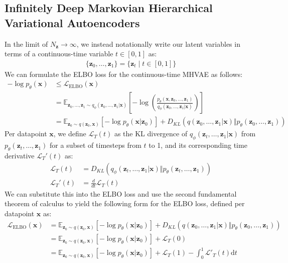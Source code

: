 \documentclass[ oneside,%
                    author={George Herbert},
                    degree={MSci},
                     title={Video Diffusion Models for Climate Simulations},
                  subtitle={}]{dissertation}
\begin{document}
\subsection{Infinitely Deep Markovian Hierarchical Variational Autoencoders}
\label{sec:background_vae_infinite}

In the limit of $N_\mathbf{z}\to\infty$, we instead notationally write our latent variables in terms of a continuous-time variable $t\in[0,1]$ as:
\begin{align}
      \{\mathbf{z}_0,\ldots,\mathbf{z}_1\}=\{\mathbf{z}_t\mid t\in[0,1]\}
\end{align}
We can formulate the ELBO loss for the continuous-time MHVAE as follows:
\begin{align}
      -\log p_\theta(\mathbf{x})&\le \mathcal{L}_{\mathrm{ELBO}}(\mathbf{x})\\
      &=\mathbb{E}_{\mathbf{z}_0,\ldots,\mathbf{z}_1\sim q_\phi(\mathbf{z}_0,\ldots,\mathbf{z}_1|\mathbf{x})}\left[-\log\left(\frac{p_\theta(\mathbf{x},\mathbf{z}_0,\ldots,\mathbf{z}_1)}{q_\phi(\mathbf{z}_0,\ldots,\mathbf{z}_1|\mathbf{x})}\right) \right]\\
      &=\mathbb{E}_{\mathbf{z}_0\sim q(\mathbf{z}_0,\mathbf{x})}\left[-\log p_\theta(\mathbf{x}|\mathbf{z}_0)\right]+D_{KL}(q(\mathbf{z}_0,\ldots,\mathbf{z}_1|\mathbf{x})\Vert p_\theta (\mathbf{z}_0,\ldots,\mathbf{z}_1))
\end{align}
Per datapoint $\mathbf{x}$, we define $\mathcal{L}_T(t)$ as the KL divergence of $q_\phi(\mathbf{z}_t,\ldots,\mathbf{z}_1|\mathbf{x})$ from $p_\theta(\mathbf{z}_t,\ldots,\mathbf{z}_1)$ for a subset of timesteps from $t$ to 1, and its corresponding time derivative $\mathcal{L}_T'(t)$ as:
\begin{align}
      \mathcal{L}_T(t)&=D_{KL}(q_\phi(\mathbf{z}_t,\ldots,\mathbf{z}_1|\mathbf{x})\Vert p_\theta(\mathbf{z}_t,\ldots,\mathbf{z}_1))\label{eq:dkl_t}\\
      \mathcal{L}_T'(t)&=\frac{d}{dt}\mathcal{L}_T(t)
\end{align}
We can substitute this into the ELBO loss and use the second fundamental theorem of calculus to yield the following form for the ELBO loss, defined per datapoint $\mathbf{x}$ as:
\begin{align}
      \mathcal{L}_{\mathrm{ELBO}}(\mathbf{x})&=\mathbb{E}_{\mathbf{z}_0\sim q(\mathbf{z}_0,\mathbf{x})}\left[-\log p_\theta(\mathbf{x}|\mathbf{z}_0)\right]+D_{KL}(q(\mathbf{z}_0,\ldots,\mathbf{z}_1|\mathbf{x})\Vert p_\theta (\mathbf{z}_0,\ldots,\mathbf{z}_1))\\
      &=\mathbb{E}_{\mathbf{z}_0\sim q(\mathbf{z}_0,\mathbf{x})}\left[-\log p_\theta(\mathbf{x}|\mathbf{z}_0)\right]+\mathcal{L}_T(0)\\
      &=\mathbb{E}_{\mathbf{z}_0\sim q(\mathbf{z}_0,\mathbf{x})}\left[-\log p_\theta(\mathbf{x}|\mathbf{z}_0)\right]+\mathcal{L}_T(1)-\int_0^1\mathcal{L}'_T(t)\mathrm{d}t \label{eq:elbo_mhvae}
\end{align}
\end{document}
